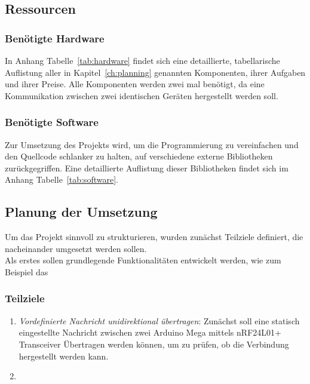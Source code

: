 \documentclass[a4paper, 11pt]{scrartcl}
\begin{document}
\subsection{Ressourcen}

\subsubsection{Benötigte Hardware}
In Anhang Tabelle~\ref{tab:hardware} findet sich eine detaillierte, tabellarische Auflistung aller in Kapitel~\ref{ch:planning} genannten Komponenten, ihrer Aufgaben und ihrer Preise.
Alle Komponenten werden zwei mal benötigt, da eine Kommunikation zwischen zwei identischen Geräten hergestellt werden soll.

\subsubsection{Benötigte Software}
Zur Umsetzung des Projekts wird, um die Programmierung zu vereinfachen und den Quellcode schlanker zu halten, auf verschiedene externe Bibliotheken zurückgegriffen.
Eine detaillierte Auflistung dieser Bibliotheken findet sich im Anhang Tabelle~\ref{tab:software}.

\subsection{Planung der Umsetzung}
Um das Projekt sinnvoll zu strukturieren, wurden zunächst Teilziele definiert, die nacheinander umgesetzt werden sollen.
\\
Als erstes sollen grundlegende Funktionalitäten entwickelt werden, wie zum Beispiel das  

\subsubsection{Teilziele}
\begin{enumerate}
    \item \textit{Vordefinierte Nachricht unidirektional übertragen}: Zunächst soll eine statisch eingestellte Nachricht zwischen zwei Arduino Mega mittels nRF24L01+ Transceiver
            Übertragen werden können, um zu prüfen, ob die Verbindung hergestellt werden kann.
    \item 
\end{enumerate}
\end{document}
